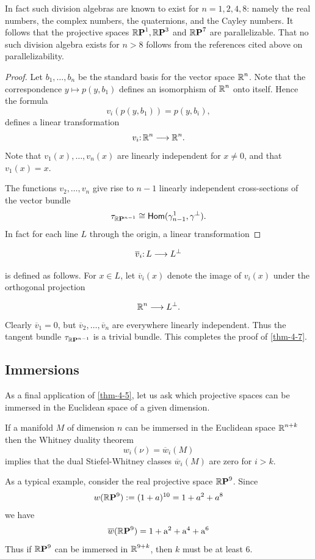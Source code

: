 In fact such division algebras are known to exist for $n =
1, 2, 4, 8$:
namely the real numbers, the complex numbers, the quaternions, and the
Cayley numbers. It follows that the projective spaces $\boldsymbol{\mathbb{R}}\boldsymbol{\mathrm{P}}^{1}, \boldsymbol{\mathbb{R}}\boldsymbol{\mathrm{P}}^{3}$ and $\boldsymbol{\mathbb{R}}\boldsymbol{\mathrm{P}}^{7}$
are parallelizable. That no such division algebra exists for $n > 8$ 
follows from the references cited above on parallelizability.	

\begin{proof}
Let $b_1,\dots, b_n$ be the standard basis for the vector
space $\boldsymbol{\mathbb{R}}^n$. Note that the correspondence $y\mapsto p(y,b_1)$
defines an isomorphism of $\boldsymbol{\mathbb{R}}^n$ onto itself. Hence the formula	
\[v_{i}\left(p(y, b_{1})\right)=p(y, b_{i}),\]
defines a linear transformation 
\[\map{v_i}{\R^n}{\R^n}.\]
Note that $v_{1}(x), \dots, v_{n}(x)$ are linearly independent for $x\neq 0$, and that
$v_1(x) = x$.

The functions $v_{2}, \dots, v_{n}$ give rise to $n-
1$ linearly independent
cross-sections of the vector bundle
\[\tau_{\boldsymbol{\mathbb{R}}\boldsymbol{\mathrm{P}}^{n-1}}\cong\mathsf{Hom}(\gamma^1_{n-1},\gamma^\perp).\]
In fact for each line $L$ through the origin, a linear transformation
\end{proof}


\[
\map{\overline{v}_{i}}{L}{L^{\perp}}
\]

is defined as follows. For $x \in L$, let $\overline{v}_{i}(x)$ denote the image of $v_{i}(x)$ under the orthogonal projection

\[
\boldsymbol{\mathbb{R}}^{n} \longrightarrow L^{\perp}.
\]
Clearly $\overline{v}_{1}=0$, but $\overline{v}_{2}, \dots, \overline{v}_{n}$ are everywhere linearly independent. Thus the tangent bundle $\tau_{\boldsymbol{\mathbb{R}}\boldsymbol{\mathrm{P}}^{n-1}}$ is a trivial bundle. This completes the proof of \cref{thm-4-7}.

\subsection*{Immersions}

As a final application of \cref{thm-4-5}, let us ask which projective spaces can be immersed in the Euclidean space of a given dimension.

If a manifold $M$ of dimension $n$ can be immersed in the Euclidean space $\boldsymbol{\mathbb{R}}^{n+k}$ then the Whitney duality theorem
\[
w_{i}(\nu)=\overline{w}_{i}(M)
\]
implies that the dual Stiefel-Whitney classes $\overline{w}_{i}(M)$ are zero for $i>k$.

As a typical example, consider the real projective space $\boldsymbol{\mathbb{R}}\boldsymbol{\mathrm{P}}^{9}$. Since
\[
w(\boldsymbol{\mathbb{R}}\boldsymbol{\mathrm{P}}^{9}):=(1+a)^{10}=1+a^{2}+a^{8}
\]
we have
\[
\overline{w}(\boldsymbol{\mathbb{R}}\boldsymbol{\mathrm{P}}^{9})=1+\mathrm{a}^{2}+\mathrm{a}^{4}+\mathrm{a}^{6}
\]
Thus if $\boldsymbol{\mathbb{R}}\boldsymbol{\mathrm{P}}^{9}$ can be immersed in $\boldsymbol{\mathbb{R}}^{9+k}$, then $k$ must be at least $6$.

